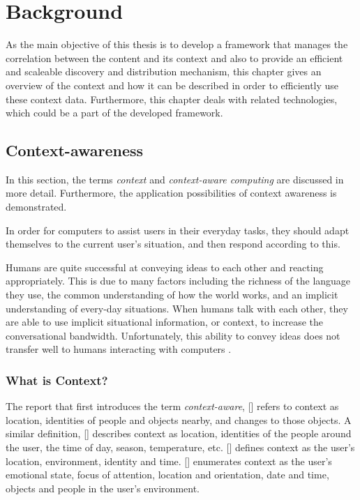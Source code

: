 \chapter{Background\label{cha:chapter2}}
As the main objective of this thesis is to develop a framework that manages the correlation between the content and its context and also to provide an efficient and scaleable discovery and distribution mechanism, this chapter gives an overview of the context and how it can be described in order to efficiently use these context data. Furthermore, this chapter deals with related technologies, which could be a part of the developed framework.

\section{Context-awareness\label{sec:back_con_aw}}
In this section, the terms \textit{context} and \textit{context-aware computing} are discussed in more detail. Furthermore, the application possibilities of context awareness is demonstrated.

In order for computers to assist users in their everyday tasks, they should adapt themselves to the current user's situation, and then respond according to this. 

Humans are quite successful at conveying ideas to each other and reacting appropriately. This is due to many factors including the richness of the language they use, the common understanding of how the world works, and an implicit understanding of every-day situations. When humans talk with each other, they are able to use implicit situational information, or context, to increase the conversational bandwidth. Unfortunately, this ability to convey ideas does not transfer well to humans interacting with computers \cite{Dey2000b}.

\subsection{What is Context?}

The report that first introduces the term \emph{context-aware}, [\citeauthor{ieee313011}] refers to context as location, identities of people and objects nearby, and changes to those objects. A similar definition, [\citeauthor{ieee626984}] describes context as location, identities of the people around the user, the time of day, season, temperature, etc. [\citeauthor{Ryan97}] defines context as the user's location, environment, identity and time. [\citeauthor{Dey98}] enumerates context as the user's emotional state, focus of attention, location and orientation, date and time, objects and people in the user's environment. %


